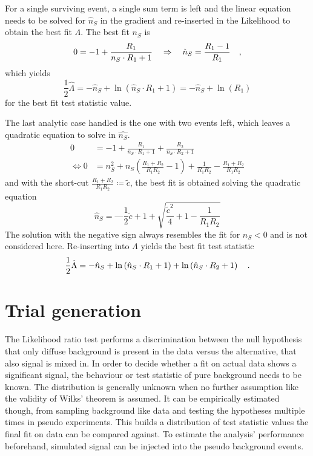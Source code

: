 For a single surviving event, a single sum term is left and the linear equation needs to be solved for $\hat{n}_S$ in the gradient and re-inserted in the Likelihood to obtain the best fit $\Lambda$.
The best fit $n_S$ is
\begin{equation}
  0 = -1 + \frac{R_1}{n_S\cdot R_1 + 1}
    \quad\Rightarrow\quad \hat{n}_S = \frac{R_1 - 1}{R_1}
  \quad\text{,}
\end{equation}
which yields
\begin{equation}
  \frac{1}{2}\hat{\Lambda}
    = -\hat{n}_S + \ln\left( \hat{n}_S \cdot R_1 + 1 \right)
    = -\hat{n}_S + \ln(R_1)
\end{equation}
for the best fit test statistic value.

The last analytic case handled is the one with two events left, which leaves a quadratic equation to solve in $\hat{n_S}$.
\begin{align}
  0 &= -1 + \frac{R_1}{n_S\cdot R_1 + 1} + \frac{R_2}{n_S\cdot R_2 + 1} \\
  \Leftrightarrow
  0 &= n_S^2 + n_S \left(\frac{R_1 + R_2}{R_1 R_2} - 1\right) +
       \frac{1}{R_1 R_2} - \frac{R_1 + R_2}{R_1 R_2}
\end{align}
and with the short-cut $\frac{R_1 + R_2}{R_1 R_2} \coloneq\tilde{c}$, the best fit is obtained solving the quadratic equation
\begin{equation}
  \hat{n}_S = —\frac{1}{2}\tilde{c} + 1 + \sqrt{\frac{\tilde{c}^2}{4} + 1 - \frac{1}{R_1 R_2}}
\end{equation}
The solution with the negative sign always resembles the fit for $n_S < 0$ and is not considered here.
Re-inserting into $\Lambda$ yields the best fit test statistic
\begin{equation}
  \frac{1}{2}\hat{\Lambda} = -\hat{n}_S +
                             \ln\left( \hat{n}_S \cdot R_1 + 1 \right) +
                             \ln\left( \hat{n}_S \cdot R_2 + 1 \right)
  \quad\text{.}
\end{equation}

\section{Trial generation}
The Likelihood ratio test performs a discrimination between the null hypothesis that only diffuse background is present in the data versus the alternative, that also signal is mixed in.
In order to decide whether a fit on actual data shows a significant signal, the behaviour or test statistic of pure background needs to be known.
The distribution is generally unknown when no further assumption like the validity of Wilks' theorem is assumed.
It can be empirically estimated though, from sampling background like data and testing the hypotheses multiple times in pseudo experiments.
This builds a distribution of test statistic values the final fit on data can be compared against.
To estimate the analysis' performance beforehand, simulated signal can be injected into the pseudo background events.

